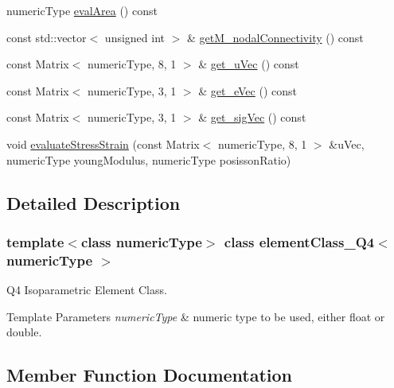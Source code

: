 \begin{DoxyCompactItemize}
\item 
numeric\+Type \mbox{\hyperlink{classelement_class___q4_a69d0aa4dabfb2555d6d47d93fcfb34be}{eval\+Area}} () const
\item 
const std\+::vector$<$ unsigned int $>$ \& \mbox{\hyperlink{classelement_class___q4_abe3f00cce16a360c1810f50f56fff445}{get\+M\+\_\+nodal\+Connectivity}} () const
\item 
const Matrix$<$ numeric\+Type, 8, 1 $>$ \& \mbox{\hyperlink{classelement_class___q4_a70653030dc6fd2a1032e1056d3e856e1}{get\+\_\+u\+Vec}} () const
\item 
const Matrix$<$ numeric\+Type, 3, 1 $>$ \& \mbox{\hyperlink{classelement_class___q4_a8fe7247b89edfe1c70d3d81e6607d27a}{get\+\_\+e\+Vec}} () const
\item 
const Matrix$<$ numeric\+Type, 3, 1 $>$ \& \mbox{\hyperlink{classelement_class___q4_ac170a307dec6500c8af43d45eb2589ff}{get\+\_\+sig\+Vec}} () const
\item 
void \mbox{\hyperlink{classelement_class___q4_aa1be80202b67c397bfccbd406bb8e88f}{evaluate\+Stress\+Strain}} (const Matrix$<$ numeric\+Type, 8, 1 $>$ \&u\+Vec, numeric\+Type young\+Modulus, numeric\+Type posisson\+Ratio)
\end{DoxyCompactItemize}


\subsection{Detailed Description}
\subsubsection*{template$<$class numeric\+Type$>$\newline
class element\+Class\+\_\+\+Q4$<$ numeric\+Type $>$}

Q4 Isoparametric Element Class. 
\begin{DoxyTemplParams}{Template Parameters}
{\em numeric\+Type} & numeric type to be used, either float or double. \\
\hline
\end{DoxyTemplParams}


\subsection{Member Function Documentation}
\mbox{\label{classelement_class___q4_a69d0aa4dabfb2555d6d47d93fcfb34be}} 
